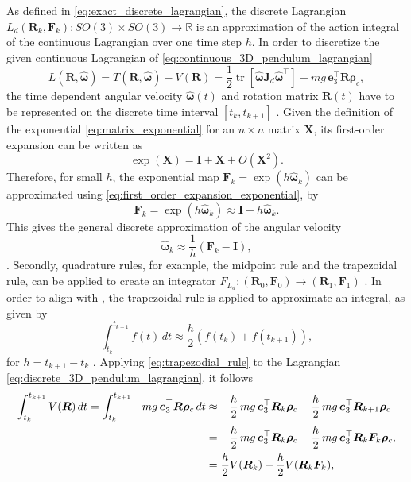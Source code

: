 As defined in \eqref{eq:exact_discrete_lagrangian}, the discrete Lagrangian $L_d(\bm{R}_k, \bm{F}_k):SO(3) \times SO(3) \to \mathbb{R} $ is an approximation of the action integral of the continuous Lagrangian over one time step $h$. In order to discretize the given continuous Lagrangian of \eqref{eq:continuous_3D_pendulum_lagrangian}
\begin{equation}\label{eq:discrete_3D_pendulum_lagrangian}
    L(\bm{R}, \hat{\bm{\omega}}) = T(\bm{R}, \hat{\bm{\omega}}) - V(\bm{R})
    = \frac{1}{2}\operatorname{tr}[\hat{\bm{\omega}} \bm{J}_d \hat{\bm{\omega}}^\top] + mg\, \bm{e}_3^\top \bm{R}\bm{\rho}_c,
\end{equation}
the time dependent angular velocity $\hat{\bm{\omega}}(t)$ and rotation matrix $\bm{R}(t)$ have to be represented on the discrete time interval $[t_k,t_{k+1}]$ \cite{Marsden2001}. Given the definition of the exponential \eqref{eq:matrix_exponential} for an $n\times n$ matrix $\bm{X}$,
its first-order expansion can be written as
\begin{equation}\label{eq:first_order_expansion_exponential}
    \exp(\bm{X}) = \bm{I} + \bm{X} + O(\bm{X}^2).
\end{equation}
Therefore, for small $h$, the exponential map $\bm{F}_k = \exp(h \hat{\bm{\omega}}_k)$ can be approximated using \eqref{eq:first_order_expansion_exponential}, by
\[
    \bm{F}_k = \exp(h \hat{\bm{\omega}}_k) \approx \bm{I} + h \hat{\bm{\omega}}_k.
\]
This gives the general discrete approximation of the angular velocity
\begin{equation}\label{eq:discrete_velocity_approximation}
    \hat{\bm{\omega}}_k \approx \frac{1}{h}(\bm{F}_k - \bm{I}),
\end{equation}
\cite{Lee2008}. Secondly, quadrature rules, for example, the midpoint rule and the trapezoidal rule, can be applied to create an integrator $F_{L_{d}}: (\bm{R}_0, \bm{F}_0) \to (\bm{R}_1, \bm{F}_1)$ \cite{Marsden2001}. In order to align with \cite{Lee2008}, the trapezoidal rule is applied to approximate an integral, as given by
\begin{equation}\label{eq:trapezodial_rule}
    \int_{t_k}^{t_{k+1}} f(t)\,dt
    \approx
    \frac{h}{2}\left(f(t_k)+f(t_{k+1})\right),
\end{equation}
for $h = t_{k+1}-t_k$ \cite{butcher2016numerical}. Applying \eqref{eq:trapezodial_rule} to the Lagrangian \eqref{eq:discrete_3D_pendulum_lagrangian}, it follows
\begin{align}\label{eq:discrete_potential_3D_pendulum}
    \int_{t_k}^{t_{k+1}} V(\bm{R}) \, dt
    =
    \int_{t_k}^{t_{k+1}} -mg\,\bm{e}_3^{\top} \bm{R} \bm{\rho}_c \, dt
    &\approx
    -\frac{h}{2}\, mg\,\bm{e}_3^{\top}  \bm{R}_k \bm{\rho}_c
    -
    \frac{h}{2}\, mg\,\bm{e}_3^{\top} \bm{R}_{k+1} \bm{\rho}_c \notag \\
    &=
    -\frac{h}{2}\, mg\,\bm{e}_3^{\top} \bm{R}_k \bm{\rho}_c
    -
    \frac{h}{2}\, mg\,\bm{e}_3^{\top} \bm{R}_k \bm{F}_k \bm{\rho}_c, \notag \\
    &=\frac{h}{2}V(\bm{R}_k)+\frac{h}{2}V(\bm{R}_k \bm{F}_k),
\end{align}
